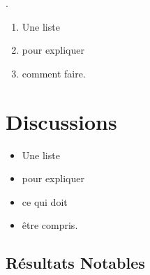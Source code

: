 \documentclass[11pt]{article} %
\begin{document}
\lipsum[2][1] .

\begin{enumerate}
	\item Une liste 
	\item pour expliquer
	\item comment faire.
\end{enumerate}


\lipsum[1-3]



\section{Discussions}
\lipsum[4][1-3]

\begin{itemize}
	\item Une liste 
	\item pour expliquer
	\item ce qui doit 
	\item être compris.
\end{itemize}


\subsection*{Résultats Notables}

\lipsum[1][1]

\nocite{*}

\printbibliography[heading=bibintoc]

\label{last page}



%
%
\end{document}

